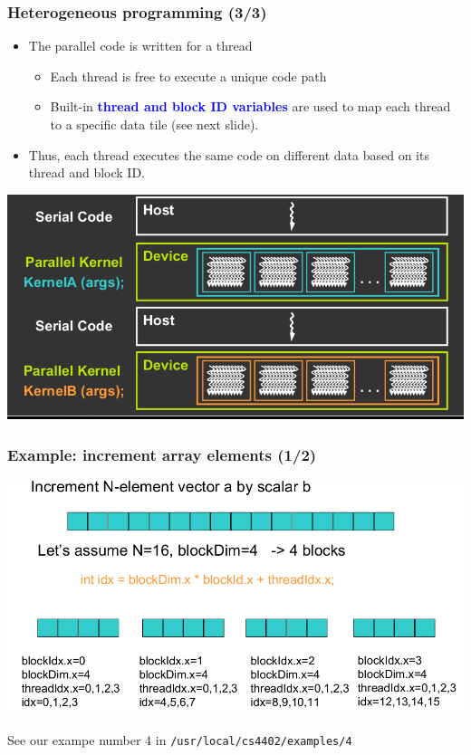 \begin{frame}[fragile]
\frametitle{Heterogeneous programming (3/3)}

\begin{itemize}
\item The parallel code is written for a thread
\begin{itemize}
\item Each thread is free to execute a unique code path
\item Built-in \textcolor{blue}{\bf thread and block ID variables}
      are used to map each thread to a specific data tile (see next slide).
\end{itemize}
\item Thus, each thread executes the same code
      on different data based on its thread and block ID.
\end{itemize}

\begin{center}
\includegraphics[scale=0.4]{images/Z-17.png}
\end{center}

\end{frame}
\begin{frame}[fragile]
\frametitle{Example: increment array elements (1/2)}

\begin{center}
\includegraphics[scale=0.5]{images/7.png}
\end{center}

See our exampe number 4 in {\tt /usr/local/cs4402/examples/4}

\end{frame}
